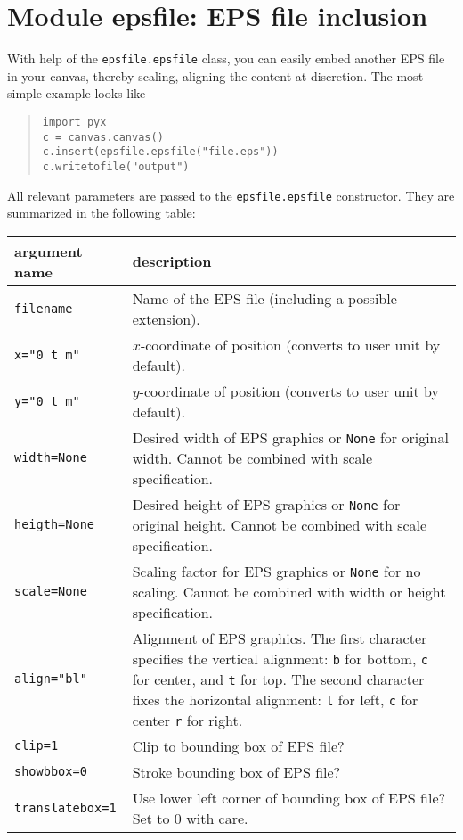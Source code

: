 \chapter{Module epsfile: EPS file inclusion}

With help of the \verb|epsfile.epsfile| class, you can easily embed
another EPS file in your canvas, thereby scaling, aligning the content
at discretion. The most simple example looks like
\begin{quote}
\begin{verbatim}
import pyx
c = canvas.canvas()
c.insert(epsfile.epsfile("file.eps"))
c.writetofile("output")
\end{verbatim}
\end{quote}

All relevant parameters are passed to the \verb|epsfile.epsfile|
constructor. They are summarized in the following table:

\medskip
\begin{tabularx}{\linewidth}{l>{\raggedright\arraybackslash}X}
argument name&description\\
\hline
\texttt{filename} & Name of the EPS file (including a possible
extension).\\
\texttt{x="0 t m"} & $x$-coordinate of position (converts to user
unit by default).\\
\texttt{y="0 t m"} & $y$-coordinate of position (converts to user
unit by default).\\
\texttt{width=None} & Desired width of EPS graphics or \texttt{None}
for original width. Cannot be combined with scale specification.\\
\texttt{heigth=None} & Desired height of EPS graphics or \texttt{None}
for original height. Cannot be combined with scale specification.\\
\texttt{scale=None} & Scaling factor for EPS graphics or \texttt{None}
for no scaling. Cannot be combined with width or height specification.\\
\texttt{align="bl"} & Alignment of EPS graphics. The first character
specifies the vertical alignment: \texttt{b} for bottom, \texttt{c}
for center, and \texttt{t} for top. The second character fixes the
horizontal alignment: \texttt{l} for left, \texttt{c} for center
\texttt{r} for right.\\
\texttt{clip=1} & Clip to bounding box of EPS file?\\
\texttt{showbbox=0} & Stroke bounding box of EPS file?\\
\texttt{translatebox=1} & Use lower left corner of bounding box of EPS
file? Set to $0$ with care.
\end{tabularx}



\label{epsfile}


